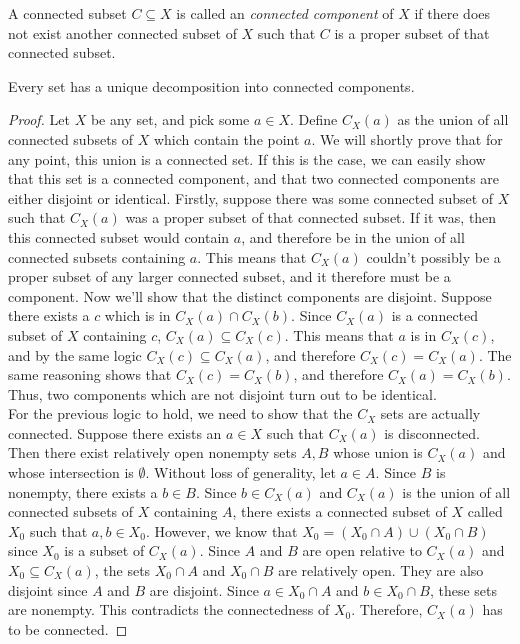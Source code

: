 \begin{definition}
A connected subset $C \subseteq X$ is called an \emph{connected component} of $X$ if there does not exist another connected subset of $X$ such that $C$ is a proper subset of that connected subset.
\end{definition}
\begin{theorem}
Every set has a unique decomposition into connected components.
\end{theorem}
\begin{proof}
Let $X$ be any set, and pick some $a \in X$. Define $C_X(a)$ as the union of all connected subsets of $X$ which contain the point $a$. We will shortly prove that for any point, this union is a connected set. If this is the case, we can easily show that this set is a connected component, and that two connected components are either disjoint or identical. Firstly, suppose there was some connected subset of $X$ such that $C_X(a)$ was a proper subset of that connected subset. If it was, then this connected subset would contain $a$, and therefore be in the union of all connected subsets containing $a$. This means that $C_X(a)$ couldn't possibly be a proper subset of any larger connected subset, and it therefore must be a component. Now we'll show that the distinct components are disjoint. Suppose there exists a $c$ which is in $C_X(a) \cap C_X(b)$. Since $C_X(a)$ is a connected subset of $X$ containing $c$, $C_X(a) \subseteq C_X(c)$. This means that $a$ is in $C_X(c)$, and by the same logic $C_X(c) \subseteq C_X(a)$, and therefore $C_X(c)=C_X(a)$. The same reasoning shows that $C_X(c) = C_X(b)$, and therefore $C_X(a) = C_X(b)$. Thus, two components which are not disjoint turn out to be identical.\\
For the previous logic to hold, we need to show that the $C_X$ sets are actually connected. Suppose there exists an $a \in X$ such that $C_X(a)$ is disconnected. Then there exist relatively open nonempty sets $A, B$ whose union is $C_X(a)$ and whose intersection is $\emptyset$. Without loss of generality, let $a \in A$. Since $B$ is nonempty, there exists a $b \in B$. Since $b \in C_X(a)$ and $C_X(a)$ is the union of all connected subsets of $X$ containing $A$, there exists a connected subset of $X$ called $X_0$ such that $a, b \in X_0$. However, we know that $X_0 = (X_0 \cap A) \cup (X_0 \cap B)$ since $X_0$ is a subset of $C_X(a)$. Since $A$ and $B$ are open relative to $C_X(a)$ and $X_0 \subseteq C_X(a)$, the sets $X_0 \cap A$ and $X_0 \cap B$ are relatively open. They are also disjoint since $A$ and $B$ are disjoint. Since $a \in X_0 \cap A$ and $b \in X_0 \cap B$, these sets are nonempty. This contradicts the connectedness of $X_0$. Therefore, $C_X(a)$ has to be connected.
\end{proof}
